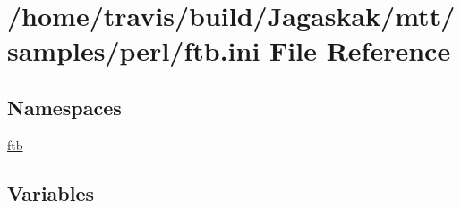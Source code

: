 \hypertarget{ftb_8ini}{\section{/home/travis/build/\-Jagaskak/mtt/samples/perl/ftb.ini File Reference}
\label{ftb_8ini}
}
\subsection*{Namespaces}
\begin{DoxyCompactItemize}
\item 
\hyperlink{namespaceftb}{ftb}
\end{DoxyCompactItemize}
\subsection*{Variables}
